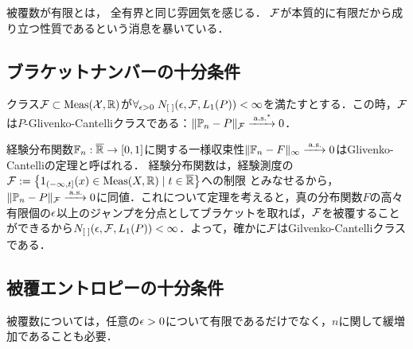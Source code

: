 \documentclass[uplatex,dvipdfmx]{jsreport}
\begin{document}
\begin{tcolorbox}[colframe=ForestGreen, colback=ForestGreen!10!white,breakable,colbacktitle=ForestGreen!40!white,coltitle=black,fonttitle=\bfseries\sffamily,
title=]
    被覆数が有限とは，
    全有界と同じ雰囲気を感じる．
    $\mathcal{F}$が本質的に有限だから成り立つ性質であるという消息を暴いている．
\end{tcolorbox}

\subsection{ブラケットナンバーの十分条件}

\begin{theorem}\label{thm-Glivenko-Cantelli-1}
    クラス$\mathcal{F}\subset\mathrm{Meas}(\mathcal{X},\mathbb{R})$が$\forall_{\epsilon>0}\;N_{[\;]}(\epsilon,\mathcal{F},L_1(P))<\infty$を満たすとする．この時，$\mathcal{F}$は$P$-Glivenko-Cantelliクラスである：$\|\mathbb{P}_n-P\|_{\mathcal{F}}\xrightarrow{\;\mathrm{a.s.}^*}0$．
\end{theorem}

\begin{example}
    経験分布関数$\mathbb{F}_n:\overline{\mathbb{R}}\to[0,1]$に関する一様収束性$\|\mathbb{F}_n-F\|_\infty\xrightarrow{\;\mathrm{a.s.}}0$はGlivenko-Cantelliの定理と呼ばれる．
    経験分布関数は，経験測度の$\mathcal{F}:=\left\{1_{(-\infty,t]}(x)\in\mathrm{Meas}(X,\mathbb{R})\mid t\in\overline{\mathbb{R}}\right\}$への制限
    とみなせるから，$\|\mathbb{P}_n-P\|_{\mathcal{F}}\xrightarrow{\;\mathrm{a.s.}}0$に同値．これについて定理を考えると，真の分布関数$F$の高々有限個の$\epsilon$以上のジャンプを分点としてブラケットを取れば，$\mathcal{F}$を被覆することができるから$N_{[\;]}(\epsilon,\mathcal{F},L_1(P))<\infty$．よって，確かに$\mathcal{F}$はGilvenko-Cantelliクラスである．
\end{example}

\subsection{被覆エントロピーの十分条件}

\begin{tcolorbox}[colframe=ForestGreen, colback=ForestGreen!10!white,breakable,colbacktitle=ForestGreen!40!white,coltitle=black,fonttitle=\bfseries\sffamily,
title=]
    被覆数については，任意の$\epsilon>0$について有限であるだけでなく，$n$に関して緩増加であることも必要．
\end{tcolorbox}
\end{document}

